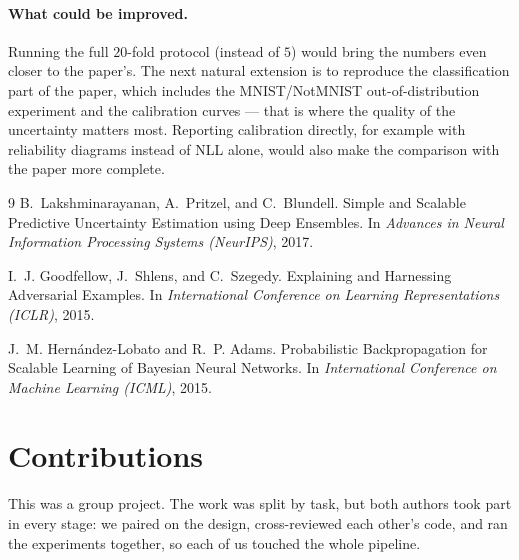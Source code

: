 \documentclass{article}
\begin{document}
\paragraph{What could be improved.}
Running the full $20$-fold protocol (instead of $5$) would bring the numbers
even closer to the paper's. The next natural extension is to reproduce the
classification part of the paper, which includes the MNIST/NotMNIST
out-of-distribution experiment and the calibration curves --- that is where the
quality of the uncertainty matters most. Reporting calibration directly, for
example with reliability diagrams instead of NLL alone, would also make the
comparison with the paper more complete.

\begin{thebibliography}{9}
B.~Lakshminarayanan, A.~Pritzel, and C.~Blundell.
\newblock Simple and Scalable Predictive Uncertainty Estimation using Deep
Ensembles.
\newblock In \emph{Advances in Neural Information Processing Systems (NeurIPS)},
2017.

I.~J. Goodfellow, J.~Shlens, and C.~Szegedy.
\newblock Explaining and Harnessing Adversarial Examples.
\newblock In \emph{International Conference on Learning Representations (ICLR)},
2015.

J.~M. Hern\'andez-Lobato and R.~P. Adams.
\newblock Probabilistic Backpropagation for Scalable Learning of Bayesian Neural
Networks.
\newblock In \emph{International Conference on Machine Learning (ICML)}, 2015.
\end{thebibliography}

\newpage
\section*{Contributions}
This was a group project. The work was split by task, but both authors took part
in every stage: we paired on the design, cross-reviewed each other's code, and
ran the experiments together, so each of us touched the whole pipeline.
\end{document}
